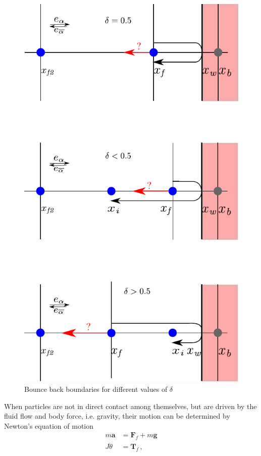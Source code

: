 \begin{figure}[htbp]
\centering
\includegraphics[height=0.9\textheight]{bouncemod}
\caption{Bounce back boundaries for different values of $\delta$}
\label{fig:bouncemod}
\end{figure}
%
When particles are not in direct contact among themselves, but are driven by 
the fluid flow and body force, i.e. gravity, their motion can be determined by 
Newton's equation of motion
%
\begin{align}
\mathit{m}\mathbf{ a} & = \mathbf{F}_{f} + \mathit{m }\mathbf{g} \\
\mathit{J } \ddot{\theta} & = \mathbf{T}_{f} \,,
\end{align}
